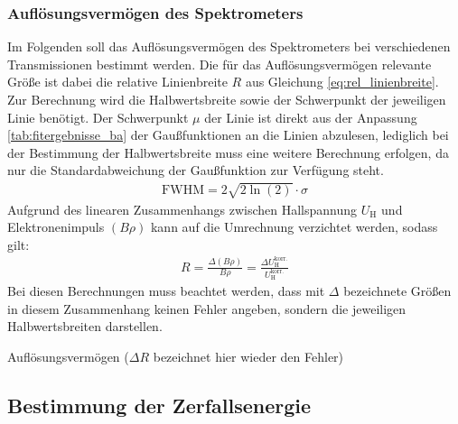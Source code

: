 \documentclass[11pt, a4paper]{article}
\numberwithin{equation}{section}
\begin{document}
\subsubsection{Auflösungsvermögen des Spektrometers}
Im Folgenden soll das Auflösungsvermögen des Spektrometers bei verschiedenen Transmissionen bestimmt werden.
Die für das Auflösungsvermögen relevante Größe ist dabei die relative Linienbreite $R$ aus Gleichung \eqref{eq:rel_linienbreite}.
Zur Berechnung wird die Halbwertsbreite sowie der Schwerpunkt der jeweiligen Linie benötigt.
Der Schwerpunkt $\mu$ der Linie ist direkt aus der Anpassung \ref{tab:fitergebnisse_ba} der Gaußfunktionen an die Linien abzulesen, lediglich bei der Bestimmung der Halbwertsbreite muss eine weitere Berechnung erfolgen, da nur die Standardabweichung der Gaußfunktion zur Verfügung steht.
\begin{align}
	\mathrm{FWHM} = 2 \sqrt{2\ln(2)} \cdot \sigma
\end{align}
Aufgrund des linearen Zusammenhangs zwischen Hallspannung $U_\mathrm{H}$ und Elektronenimpuls $(B \rho)$ kann auf die Umrechnung verzichtet werden, sodass gilt:
\begin{align*}
	R = \frac{\Delta (B \rho)}{B \rho} = \frac{\Delta U_\mathrm{H}^\mathrm{korr.}}{U_\mathrm{H}^\mathrm{korr.}}
\end{align*}
Bei diesen Berechnungen muss beachtet werden, dass mit $\Delta$ bezeichnete Größen in diesem Zusammenhang keinen Fehler angeben, sondern die jeweiligen Halbwertsbreiten darstellen.

\begin{table}[h]
	\centering
	
	\caption{Auflösungsvermögen ($\Delta R$ bezeichnet hier wieder den Fehler)}
	\label{tab:aufloesungsvermoegen}
\end{table}

\subsection{Bestimmung der Zerfallsenergie}
\end{document}
